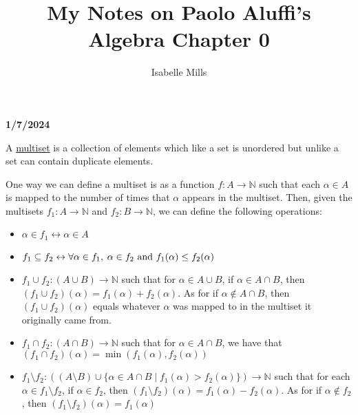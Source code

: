 \documentclass{book}
\title{My Notes on Paolo Aluffi's Algebra Chapter 0}
\author{Isabelle Mills}
\newcommand{\hOne}{%
   \color{Black}%
   \fontsize{14}{14}\selectfont%
}
\newcommand{\hTwo}{%
   \color{MidnightBlue}%
   \fontsize{13}{13}\selectfont%
}
\newcommand{\hThree}{%
   \color{PineGreen}
   \fontsize{13}{13}\selectfont%
}
\newenvironment{myIndent}{%
   \begin{adjustwidth}{2.5em}{0em}%
}{%
   \end{adjustwidth}%
}
\newcommand{\udefine}[1]{%
   \setulcolor{Red}%
   \setul{0.1ex}{0.15ex}%
   \ul{#1}%
}
\newcommand*{\markDate}[1]{
   {\huge \color{Black} \textbf{#1} \newline}
}
\begin{document}
   \maketitle{}

   \markDate{1/7/2024}

   \hOne
   A \udefine{multiset} is a collection of elements 
   which like a set is unordered but unlike a set can
   contain duplicate elements.
   
   \begin{myIndent}
      \hTwo
      One way we can define a multiset is as a function
      \( f: A\rightarrow\mathbb{N} \) such that each
      \(\alpha \in A \) is mapped to the number of times that 
      \(\alpha\) appears in the multiset. Then, given the multisets 
      \(f_{1}: A\rightarrow \mathbb{N}\) and \(f_{2}: 
      B \rightarrow \mathbb{N}\), we can define the following
      operations:

      \hThree
      \begin{itemize}
         \item \(\alpha \in f_{1} \leftrightarrow \alpha \in A\)

         \item \(f_{1} \subseteq f_{2} \leftrightarrow 
               \forall \alpha \in f_{1}, \hspace{0.25em} \alpha \in f_{2} 
               \text{ and } f_{1}(\alpha) \leq f_{2}(\alpha)\)

         \item \(f_{1} \cup f_{2}: (A \cup B) \rightarrow
               \mathbb{N} \) such that for \(\alpha
               \in A \cup B\), if \(\alpha \in A \cap B \),
               then\\ \((f_{1} \cup f_{2})(\alpha) = f_{1}(\alpha)
               + f_{2}(\alpha)\). As for if \(\alpha \notin 
               A \cap B \), then \((f_{1} \cup f_{2})(\alpha)\)
               equals whatever $\alpha$ was mapped to 
               in the multiset it originally came from.
         
         \item \(f_{1} \cap f_{2}: (A \cap B) \rightarrow
               \mathbb{N} \) such that for \(\alpha
               \in A \cap B\), we have that\\
               \((f_{1} \cap f_{2})(\alpha) = \min(f_{1}(\alpha)
               , f_{2}(\alpha))\)
         
         \item \(f_{1} \setminus f_{2}: ((A \setminus B)
               \cup \{\alpha \in A \cap B \mid f_{1}(\alpha) >
               f_{2}(\alpha)\}) \rightarrow \mathbb{N} \) 
               such that for each \(\alpha \in f_{1} \setminus f_{2}\), 
               if \(\alpha \in f_{2} \), then \((f_{1} \setminus f_{2})(\alpha) 
               = f_{1}(\alpha) - f_{2}(\alpha)\). As for if \(\alpha 
               \notin f_{2} \), then \((f_{1} \setminus f_{2})(\alpha) = 
               f_{1}(\alpha)\)
         

\end{itemize}
\end{myIndent}
\end{document}
